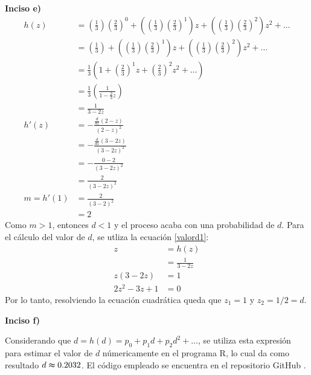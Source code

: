\documentclass{article}
\begin{document}
\noindent \textbf{Inciso e)}
\begin{align}
    \nonumber
        h(z)        & = \left(\frac{1}{3}\right)\left(\frac{2}{3}\right)^0 + \left(\left(\frac{1}{3}\right)\left(\frac{2}{3}\right)^1\right)z + \left(\left(\frac{1}{3}\right)\left(\frac{2}{3}\right)^2\right)z^2 + \dots \\ \nonumber
                    & = \left(\frac{1}{3}\right) + \left(\left(\frac{1}{3}\right)\left(\frac{2}{3}\right)^1\right)z + \left(\left(\frac{1}{3}\right)\left(\frac{2}{3}\right)^2\right)z^2 + \dots \\ \nonumber
                    & = \frac{1}{3} \left(1 + \left(\frac{2}{3}\right)^1z + \left(\frac{2}{3}\right)^2z^2 + \dots \right)\\ \nonumber
                    & = \frac{1}{3} \left(\frac{1}{1-\frac{2}{3}z} \right)\\ \nonumber
                    & = \frac{1}{3-2z} \\ \nonumber
        h'(z)       & = -\frac{\frac{d}{dz}(2-z)}{(2-z)^2} \\ \nonumber
                     & = -\frac{\frac{d}{dz}(3-2z)}{(3-2z)^2} \\ \nonumber
                    & =-\frac{0-2}{(3-2z)^2} \\ \nonumber
                    & =\frac{2}{(3-2z)^2} \\ \nonumber
        m = h'(1)   & = \frac{2}{(3-2)^2}  \\ \nonumber
                    & = 2 \nonumber
\end{align}
Como $m > 1$, entonces $d<1$ y el proceso acaba con una probabilidad de $d$. Para el cálculo del valor de $d$, se utliza la ecuación \ref{valord1}:
\begin{align} \label{valord1}
        z & = h{(z)}\\ \nonumber
          & = \frac{1}{3-2z} \\ \nonumber
        z({3-2z}) & = 1\\ 
        2z^2-3z+1 & = 0  \nonumber 
\end{align}
Por lo tanto, resolviendo la ecuación cuadrática queda que $z_1 = 1$ y $z_2 = 1/2 = d$.

\noindent \textbf{Inciso f)}

Considerando que $d=h{(d)=p_{0} + p_{1}d + p_{2}d^2+\dots}$, se utiliza esta expresión para estimar el valor de $d$ númericamente en el programa R, lo cual da como resultado $d \thickapprox 0.2032$. El código empleado se encuentra en el repositorio GitHub \cite{github}.
\end{document}
